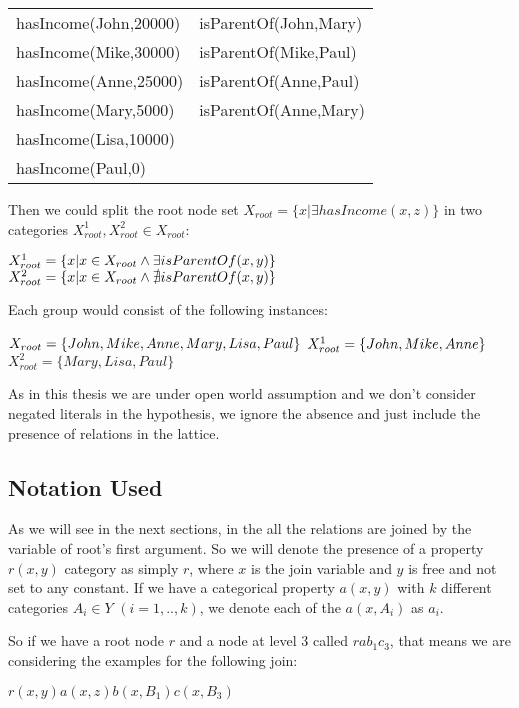 \begin{tabular}{*{2}{l}}
  hasIncome(John,20000) & isParentOf(John,Mary) \\
  hasIncome(Mike,30000) & isParentOf(Mike,Paul) \\
  hasIncome(Anne,25000) & isParentOf(Anne,Paul) \\
  hasIncome(Mary,5000) 	& isParentOf(Anne,Mary) \\
  hasIncome(Lisa,10000) & 			\\
  hasIncome(Paul,0)	& 			\\
\end{tabular}

Then we could split the root node set $X_{root}=\{x|\exists hasIncome(x,z)\}$ in two categories $X_{root}^1,X_{root}^2
\in
X_{root}$:

$X_{root}^1=\{x| x \in X_{root} \land \exists isParentOf(x,y)\} \\$
$X_{root}^2=\{x| x \in X_{root} \land \nexists isParentOf(x,y)\} \\$

Each group would consist of the following instances:

$X_{root}=\{John,Mike,Anne,Mary,Lisa,Paul\} \\$
$X_{root}^1=\{John,Mike,Anne\} \\$
$X_{root}^2=\{Mary,Lisa,Paul\}$

As in this thesis we are under open world assumption and we don't consider negated literals in the hypothesis, we ignore
the absence and just include the presence of relations in the lattice.


\subsection{Notation Used}

As we will see in the next sections, in the \graphname all the relations are joined by the variable of root's first
argument. So we will denote the presence of a property $r(x,y)$ category as simply $r$, where $x$ is the join variable
and $y$ is free and not set to any constant. If we have a categorical property $a(x,y)$ with $k$ different categories
$A_i \in Y$ $(i=1,..,k)$, we denote each of the $a(x,A_i)$ as $a_i$.

So if we have a root node $r$ and a node at level 3 called $rab_1c_3$, that means we are considering the examples for
the following join:

$r(x,y)a(x,z)b(x,B_1)c(x,B_3)$


